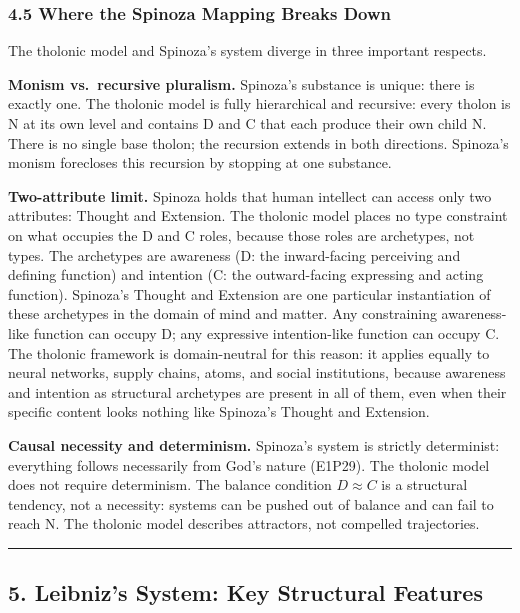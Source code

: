 \documentclass[
  11pt,
  letterpaper,
]{article}
\begin{document}
\subsubsection{4.5 Where the Spinoza Mapping Breaks
Down}\label{where-the-spinoza-mapping-breaks-down}

The tholonic model and Spinoza's system diverge in three important
respects.

\textbf{Monism vs.~recursive pluralism.} Spinoza's substance is unique:
there is exactly one. The tholonic model is fully hierarchical and
recursive: every tholon is N at its own level and contains D and C that
each produce their own child N. There is no single base tholon; the
recursion extends in both directions. Spinoza's monism forecloses this
recursion by stopping at one substance.

\textbf{Two-attribute limit.} Spinoza holds that human intellect can
access only two attributes: Thought and Extension. The tholonic model
places no type constraint on what occupies the D and C roles, because
those roles are archetypes, not types. The archetypes are awareness (D:
the inward-facing perceiving and defining function) and intention (C:
the outward-facing expressing and acting function). Spinoza's Thought
and Extension are one particular instantiation of these archetypes in
the domain of mind and matter. Any constraining awareness-like function
can occupy D; any expressive intention-like function can occupy C. The
tholonic framework is domain-neutral for this reason: it applies equally
to neural networks, supply chains, atoms, and social institutions,
because awareness and intention as structural archetypes are present in
all of them, even when their specific content looks nothing like
Spinoza's Thought and Extension.

\textbf{Causal necessity and determinism.} Spinoza's system is strictly
determinist: everything follows necessarily from God's nature (E1P29).
The tholonic model does not require determinism. The balance condition
\(D \approx C\) is a structural tendency, not a necessity: systems can
be pushed out of balance and can fail to reach N. The tholonic model
describes attractors, not compelled trajectories.

\begin{center}\rule{0.5\linewidth}{0.5pt}\end{center}

\subsection{5. Leibniz's System: Key Structural
Features}\label{leibnizs-system-key-structural-features}
\end{document}
